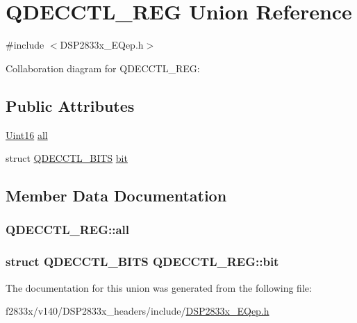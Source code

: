 \hypertarget{union_q_d_e_c_c_t_l___r_e_g}{}\section{Q\+D\+E\+C\+C\+T\+L\+\_\+\+R\+E\+G Union Reference}
\label{union_q_d_e_c_c_t_l___r_e_g}


{\ttfamily \#include $<$D\+S\+P2833x\+\_\+\+E\+Qep.\+h$>$}



Collaboration diagram for Q\+D\+E\+C\+C\+T\+L\+\_\+\+R\+E\+G\+:
\subsection*{Public Attributes}
\begin{DoxyCompactItemize}
\item 
\hyperlink{_d_s_p2833x___device_8h_a59a9f6be4562c327cbfb4f7e8e18f08b}{Uint16} \hyperlink{union_q_d_e_c_c_t_l___r_e_g_a1cf019b1c2ebcd2fefb3318ef3e9d398}{all}
\item 
struct \hyperlink{struct_q_d_e_c_c_t_l___b_i_t_s}{Q\+D\+E\+C\+C\+T\+L\+\_\+\+B\+I\+T\+S} \hyperlink{union_q_d_e_c_c_t_l___r_e_g_abd7ade2840cc1d39f702d8ab2491a7c2}{bit}
\end{DoxyCompactItemize}


\subsection{Member Data Documentation}
\hypertarget{union_q_d_e_c_c_t_l___r_e_g_a1cf019b1c2ebcd2fefb3318ef3e9d398}{}
\subsubsection[{all}]{ Q\+D\+E\+C\+C\+T\+L\+\_\+\+R\+E\+G\+::all}\label{union_q_d_e_c_c_t_l___r_e_g_a1cf019b1c2ebcd2fefb3318ef3e9d398}
\hypertarget{union_q_d_e_c_c_t_l___r_e_g_abd7ade2840cc1d39f702d8ab2491a7c2}{}
\subsubsection[{bit}]{\setlength{\rightskip}{0pt plus 5cm}struct {\bf Q\+D\+E\+C\+C\+T\+L\+\_\+\+B\+I\+T\+S} Q\+D\+E\+C\+C\+T\+L\+\_\+\+R\+E\+G\+::bit}\label{union_q_d_e_c_c_t_l___r_e_g_abd7ade2840cc1d39f702d8ab2491a7c2}


The documentation for this union was generated from the following file\+:\begin{DoxyCompactItemize}
\item 
f2833x/v140/\+D\+S\+P2833x\+\_\+headers/include/\hyperlink{_d_s_p2833x___e_qep_8h}{D\+S\+P2833x\+\_\+\+E\+Qep.\+h}\end{DoxyCompactItemize}
